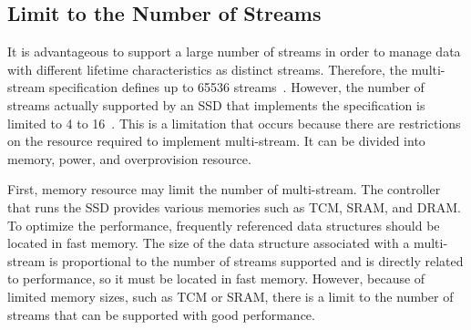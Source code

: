\subsection{Limit to the Number of Streams}
It is advantageous to support a large number of streams in order to manage data with different lifetime characteristics as distinct streams.
Therefore, the multi-stream specification defines up to 65536 streams~\cite{T10, NVMe}.
However, the number of streams actually supported by an SSD that implements the specification is limited to 4 to 16~\cite{MultiStream, NoSQLDB, AutoStream}.
This is a limitation that occurs because there are restrictions on the resource required to implement multi-stream. It can be divided into memory, power, and overprovision resource.

First, memory resource may limit the number of multi-stream.
The controller that runs the SSD provides various memories such as TCM, SRAM, and DRAM. 
To optimize the performance, frequently referenced data structures should be located in fast memory.
The size of the data structure associated with a multi-stream is proportional to the number of streams supported and is directly related to performance, so it must be located in fast memory.
However, because of limited memory sizes, such as TCM or SRAM,
 there is a limit to the number of streams that can be supported with good performance.

